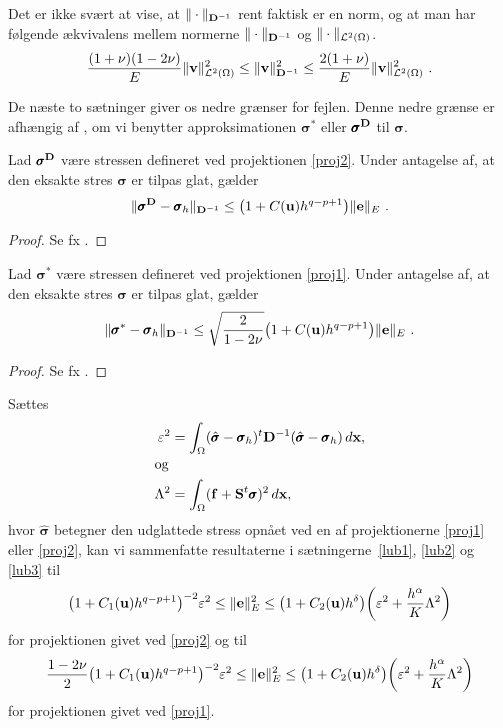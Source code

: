 \begin{remark}
Det er ikke svært at vise, at $\|\cdot\|_{{\bf D}^{-1}}$ rent faktisk er en norm,
og at man har følgende ækvivalens mellem normerne $\|\cdot\|_{{\bf D}^{-1}}$ og
$\|\cdot\|_{{\mathcal L}^2(\Omega)}$.
\begin{equation}
  \frac{(1+\nu)(1-2\nu)}{E}\|{\bf v}\|_{{\mathcal L}^2(\Omega)}^2
  \leq \|{\bf v}\|_{{\bf D}^{-1}}^2 \leq
  \frac{2(1+\nu)}{E}\|{\bf v}\|_{{\mathcal L}^2(\Omega)}^2 \ .
\end{equation}
\end{remark}
De næste to sætninger giver os nedre grænser for fejlen. Denne nedre
grænse er afhængig af , om vi benytter approksimationen
$\pmb{\sigma}^{\ast}$ eller $\pmb{\sigma}^{\bf D}$ til $\pmb\sigma$.
\begin{theorem} \label{lub2}
Lad $\pmb{\sigma}^{\bf D}$ være stressen defineret ved projektionen \eqref{proj2}.
Under antagelse af, at den eksakte stres $\pmb{\sigma}$ er tilpas glat,
gælder
\begin{equation}
  \|\pmb{\sigma}^{\bf D} -\pmb{\sigma}_h\|_{{\bf D}^{-1}} \leq
  \bigl(1+C({\bf u})h^{q-p+1}\bigr)\|{\bf e}\|_E \ .
\end{equation}
\end{theorem}
\begin{proof}
Se fx \cite{zz2}.
\end{proof}
\begin{theorem} \label{lub3}
Lad $\pmb{\sigma}^{\ast}$ være stressen defineret ved projektionen \eqref{proj1}.
Under antagelse af, at den eksakte stres $\pmb{\sigma}$ er tilpas glat,
gælder
\begin{equation}
  \|\pmb{\sigma}^{\ast} -\pmb{\sigma}_h\|_{{\bf D}^{-1}} \leq
  \sqrt{\frac{2}{1-2\nu}}\bigl(1+C({\bf u})h^{q-p+1}\bigr)\|{\bf e}\|_E \ .
\end{equation}
\end{theorem}
\begin{proof}
Se fx \cite{zz2}.
\end{proof}

Sættes
\begin{align}
  \varepsilon^2 &= \int_{\Omega} (\hat{\pmb{\sigma}}-\pmb{\sigma}_h)^t {\bf D}^{-1}
  (\hat{\pmb{\sigma}}-\pmb{\sigma}_h)\, d{\bf x}, \\
\intertext{og}
  \Lambda^2 &= \int_{\Omega} ({\bf f+S}^t\pmb{\sigma})^2\, d{\bf x},
\end{align}
hvor $\hat{\pmb{\sigma}}$ betegner den udglattede stress opnået ved en
af projektionerne \eqref{proj1} eller \eqref{proj2}, kan vi sammenfatte
resultaterne i sætningerne~\ref{lub1}, \ref{lub2} og \ref{lub3} til
\begin{equation}
  \bigl( 1+C_1({\bf u})h^{q-p+1}\bigr)^{-2}\varepsilon^2 \leq
  \|{\bf e}\|^2_E \leq
  \bigl( 1+C_2({\bf u})h^\delta\bigr)\biggl(\varepsilon^2 +
  \frac{h^\alpha}{K}\Lambda^2 \biggr)
\end{equation}
for projektionen givet ved \eqref{proj2} og til
\begin{equation}
  \frac{1-2\nu}{2}\bigl( 1+C_1({\bf u})h^{q-p+1}\bigr)^{-2}\varepsilon^2 \leq
  \|{\bf e}\|^2_E \leq
  \bigl( 1+C_2({\bf u})h^\delta\bigr)\biggl(\varepsilon^2 +
  \frac{h^\alpha}{K}\Lambda^2 \biggr)
\end{equation}
for projektionen givet ved \eqref{proj1}.

